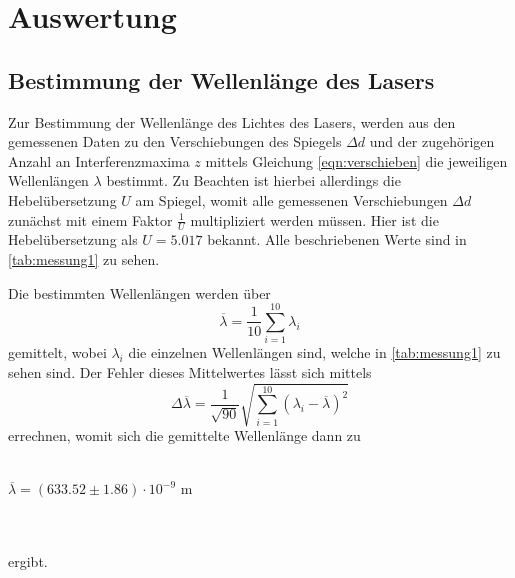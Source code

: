 \section{Auswertung}
\label{sec:Auswertung}
    \subsection{Bestimmung der Wellenlänge des Lasers}
        Zur Bestimmung der Wellenlänge des Lichtes des Lasers, werden aus den gemessenen Daten zu den Verschiebungen des Spiegels 
        $\Delta d$ und der zugehörigen Anzahl an Interferenzmaxima $z$ mittels Gleichung \eqref{eqn:verschieben} die jeweiligen 
        Wellenlängen $\lambda$ bestimmt. Zu Beachten ist hierbei allerdings die Hebelübersetzung $U$ am Spiegel, womit alle gemessenen Verschiebungen
        $\Delta d$ zunächst mit einem Faktor $\frac{1}{U}$ multipliziert werden müssen. Hier ist die Hebelübersetzung als $U = 5.017$ bekannt.
        Alle beschriebenen Werte sind in \autoref{tab:messung1} zu sehen.
        
        Die bestimmten Wellenlängen werden über 
        \begin{equation}
        \label{eqn:mittellung}
            \overline{\lambda} = \frac{1}{10} \sum_{i = 1}^{10} \lambda_{i}
        \end{equation}
        gemittelt, wobei $\lambda_{i}$ die einzelnen Wellenlängen sind, welche in \autoref{tab:messung1} zu sehen sind.
        Der Fehler dieses Mittelwertes lässt sich mittels 
        \begin{equation}
        \label{eqn:fehler_mittel}
            \Delta \overline{\lambda} = \frac{1}{\sqrt{90}} \sqrt{\sum_{i=1}^{10} (\lambda_i - \overline{\lambda})^2}
        \end{equation}    
        errechnen, womit sich die gemittelte Wellenlänge dann zu 
        \\ \\
        \centerline{$\overline{\lambda} = (633.52 \pm 1.86) \cdot 10^{-9} $ m}
        \\ \\
        ergibt.
